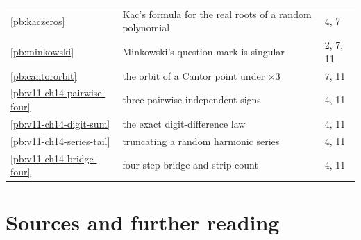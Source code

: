 \begin{center}
{\begin{tabular}{lll}
\ref{pb:kaczeros} & Kac's formula for the real roots of a random polynomial & 4, 7\\
\ref{pb:minkowski} & Minkowski's question mark is singular & 2, 7, 11\\
\ref{pb:cantororbit} & the orbit of a Cantor point under $\times3$ & 7, 11\\
\ref{pb:v11-ch14-pairwise-four} & three pairwise independent signs & 4, 11\\
\ref{pb:v11-ch14-digit-sum} & the exact digit-difference law & 4, 11\\
\ref{pb:v11-ch14-series-tail} & truncating a random harmonic series & 4, 11\\
\ref{pb:v11-ch14-bridge-four} & four-step bridge and strip count & 4, 11\\
\end{tabular}}
\end{center}

\section*{Sources and further reading}

